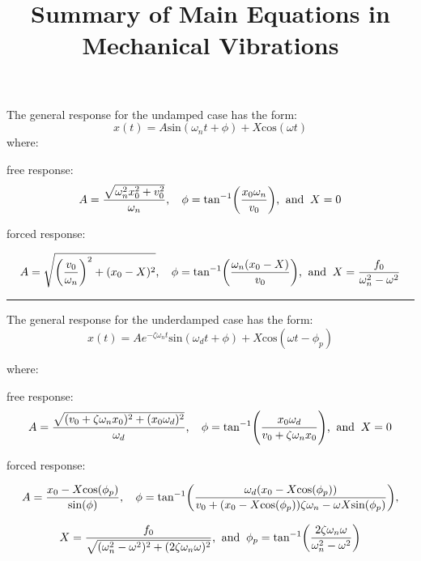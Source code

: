 \documentclass[12pt,a4paper]{article}
\begin{document}
	
	\large{}
	
	\title{\vspace{-2cm} Summary of Main Equations in Mechanical Vibrations}
	\date{}
	\maketitle
	
The general response for the undamped case has the form:
\begin{equation*}
	x(t) = A \text{sin}(\omega_n t + \phi) + X \text{cos}(\omega t)
\end{equation*}	
where:

free response:
\begin{equation*}
	A = \frac{\sqrt{\omega_n^2x_0^2+v_0^2}}{\omega_n} \text{,\;\;\;\;} \phi = \text{tan}^{-1}\bigg(\frac{x_0\omega_n}{v_0}\bigg) \text{,\;\;and\;\;} X=0
\end{equation*}

forced response:

\begin{equation*}
	A = \sqrt{\bigg(\frac{v_0}{\omega_n}\bigg)^2+(x_0-X)^2} \text{,\;\;\;\;} \phi = \text{tan}^{-1}\bigg(\frac{\omega_n(x_0-X)}{v_0}\bigg) \text{,\;\;and\;\;} X=\frac{f_0}{\omega_n^2-\omega^2}
\end{equation*}

\noindent\rule{\textwidth}{1pt}
The general response for the underdamped case has the form:
\begin{equation*}
	x(t) = A e^{-\zeta \omega_n t}\text{sin}(\omega_d t + \phi) + X \text{cos}(\omega t - \phi_p)
\end{equation*}	
		
		
where:

free response:
\begin{equation*}
	A = \frac{\sqrt{(v_0+\zeta\omega_nx_0)^2 + (x_0\omega_d)^2}}{\omega_d} \text{,\;\;\;\;} \phi = \text{tan}^{-1}\Bigg(\frac{x_0\omega_d}{v_0+\zeta\omega_nx_0}\Bigg)  \text{,\;\;and\;\;} X=0
\end{equation*}

forced response:

\begin{equation*}
	A = \frac{x_0 -X \text{cos}(\phi_p)}{\text{sin}(\phi)} \text{,\;\;\;\;} \phi = \text{tan}^{-1}\bigg(\frac{\omega_d ( x_0 -X \text{cos}(\phi_p))}{v_0 + (x_0 - X \text{cos}(\phi_p)) \zeta \omega_n - \omega X \text{sin}(\phi_p) }\bigg),
\end{equation*}

\begin{equation*}
	X = \frac{f_0}{\sqrt{(\omega_n^2 - \omega^2)^2 +  (2\zeta \omega_n \omega)^2}}  \text{,\;\;and\;\;} \phi_p = \text{tan}^{-1}\bigg(\frac{2\zeta \omega_n \omega}{\omega_n^2 - \omega^2}\bigg)
\end{equation*}
\end{document}
